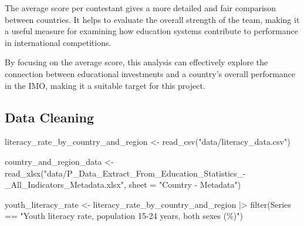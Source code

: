 \documentclass[
  letterpaper,
  DIV=11,
  numbers=noendperiod]{scrartcl}
\newenvironment{Shaded}{\begin{snugshade}}{\end{snugshade}}
\newcommand{\AttributeTok}[1]{\textcolor[rgb]{0.40,0.45,0.13}{#1}}
\newcommand{\FunctionTok}[1]{\textcolor[rgb]{0.28,0.35,0.67}{#1}}
\newcommand{\NormalTok}[1]{\textcolor[rgb]{0.00,0.23,0.31}{#1}}
\newcommand{\OtherTok}[1]{\textcolor[rgb]{0.00,0.23,0.31}{#1}}
\newcommand{\SpecialCharTok}[1]{\textcolor[rgb]{0.37,0.37,0.37}{#1}}
\newcommand{\StringTok}[1]{\textcolor[rgb]{0.13,0.47,0.30}{#1}}
\begin{document}
The average score per contestant gives a more detailed and fair
comparison between countries. It helps to evaluate the overall strength
of the team, making it a useful measure for examining how education
systems contribute to performance in international competitions.

By focusing on the average score, this analysis can effectively explore
the connection between educational investments and a country's overall
performance in the IMO, making it a suitable target for this project.

\subsection{Data Cleaning}\label{data-cleaning}

\begin{Shaded}
\begin{Highlighting}[]
\NormalTok{literacy\_rate\_by\_country\_and\_region }\OtherTok{\textless{}{-}} \FunctionTok{read\_csv}\NormalTok{(}\StringTok{"data/literacy\_data.csv"}\NormalTok{)}

\NormalTok{country\_and\_region\_data }\OtherTok{\textless{}{-}} \FunctionTok{read\_xlsx}\NormalTok{(}\StringTok{"data/P\_Data\_Extract\_From\_Education\_Statistics\_{-}\_All\_Indicators\_Metadata.xlsx"}\NormalTok{, }\AttributeTok{sheet =} \StringTok{"Country {-} Metadata"}\NormalTok{)}

\NormalTok{youth\_literacy\_rate }\OtherTok{\textless{}{-}}\NormalTok{ literacy\_rate\_by\_country\_and\_region }\SpecialCharTok{|\textgreater{}}
  \FunctionTok{filter}\NormalTok{(Series }\SpecialCharTok{==} \StringTok{"Youth literacy rate, population 15{-}24 years, both sexes (\%)"}\NormalTok{)}


\end{Highlighting}
\end{Shaded}
\end{document}

